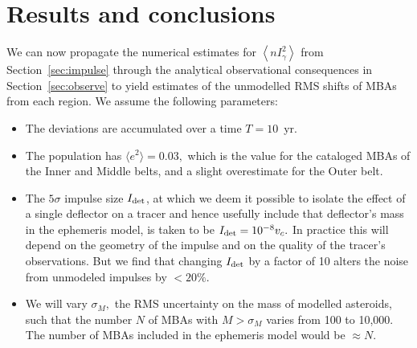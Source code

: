 \documentclass[linenumbers, onecolumn]{aastex631}
\begin{document}
\section{Results and conclusions}
\label{sec:results}
We can now propagate the numerical estimates for $\left\langle nI_\gamma^2\right\rangle$ from Section~\ref{sec:impulse} through the analytical observational consequences in Section~\ref{sec:observe} to yield estimates of the unmodelled RMS shifts of MBAs from each region.  We assume the following parameters:
\begin{itemize}
\item The deviations are accumulated over a time $T=10$~yr.
\item The population has $\langle e^2 \rangle=0.03,$ which is the value for the cataloged MBAs of the Inner and Middle belts, and a slight overestimate for the Outer belt.
\item The $5\sigma$ impulse size $I_{\rm det}$, at which we deem it possible to isolate the effect of a single deflector on a tracer and hence usefully include that deflector's mass in the ephemeris model, is taken to be $I_{\rm det} = 10^{-8}v_c.$ In practice this will depend on the geometry of the impulse and on the quality of the tracer's observations.  But we find that changing $I_{\rm det}$ by a factor of 10 alters the noise from unmodeled impulses by $<20\%.$
  \item We will vary $\sigma_M,$ the RMS uncertainty on the mass of modelled asteroids, such that the number $N$ of MBAs  with $M>\sigma_M$ varies from 100 to 10,000.  The number of MBAs included in the ephemeris model would be $\approx N.$ 
\end{itemize}
\end{document}
